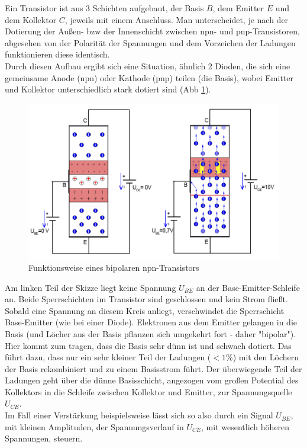 \documentclass[12pt,a4paper]{article}
\begin{document}
\begin{multicols}{2}
Ein Transistor ist aus 3 Schichten aufgebaut, der Basis $B$, dem Emitter $E$ und dem Kollektor $C$, jeweils mit einem Anschluss. Man unterscheidet, je nach der Dotierung der Außen- bzw der Innenschicht zwischen npn- und pnp-Transistoren, abgesehen von der Polarität der Spannungen und dem Vorzeichen der Ladungen funktionieren diese identisch.\\
Durch diesen Aufbau ergibt sich eine Situation, ähnlich 2 Dioden, die sich eine gemeinsame Anode (npn) oder Kathode (pnp) teilen (die Basis), wobei Emitter und Kollektor unterschiedlich stark dotiert sind (Abb \ref{fig:bipolar_transistor_skizze}).

\begin{figure}[H]
	\centering
	\includegraphics[scale=0.55]{./data/bipolar_transistor_skizze.png}
	\caption{Funktionsweise eines bipolaren npn-Transistors}
	\label{fig:bipolar_transistor_skizze}
\end{figure}

Am linken Teil der Skizze liegt keine Spannung $U_{BE}$ an der Base-Emitter-Schleife an. Beide Sperrschichten im Transistor sind geschlossen und kein Strom fließt.\\
Sobald eine Spannung an diesem Kreis anliegt, verschwindet die Sperrschicht Base-Emitter (wie bei einer Diode). Elektronen aus dem Emitter gelangen in die Basis (und Löcher aus der Basis pflanzen sich umgekehrt fort - daher "bipolar").\\
Hier kommt zum tragen, dass die Basis sehr dünn ist und schwach dotiert. Das führt dazu, dass nur ein sehr kleiner Teil der Ladungen ($<1\%$) mit den Löchern der Basis rekombiniert und zu einem Basisstrom führt. Der überwiegende Teil der Ladungen geht über die dünne Basisschicht, angezogen vom großen Potential des Kollektors in die Schleife zwischen Kollektor und Emitter, zur Spannungsquelle $U_{CE}$.\\
Im Fall einer Verstärkung beispielsweise lässt sich so also durch ein Signal $U_{BE}$, mit kleinen Amplituden, der Spannungsverlauf in $U_{CE}$, mit wesentlich höheren Spannungen, steuern.\\



\end{multicols}
\end{document}
